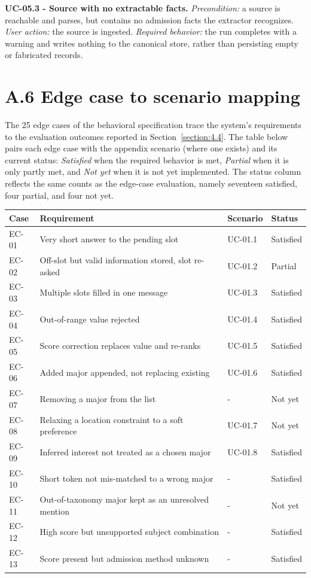 \documentclass[../main.tex]{subfiles}
\begin{document}
\textbf{UC-05.3 - Source with no extractable facts.}
\textit{Precondition:} a source is reachable and parses, but contains no admission facts the extractor recognizes.
\textit{User action:} the source is ingested.
\textit{Required behavior:} the run completes with a warning and writes nothing to the canonical store, rather than persisting empty or fabricated records.

\section*{A.6 Edge case to scenario mapping}

The 25 edge cases of the behavioral specification trace the system's requirements to the evaluation outcomes reported in Section~\ref{section:4.4}. The table below pairs each edge case with the appendix scenario (where one exists) and its current status: \textit{Satisfied} when the required behavior is met, \textit{Partial} when it is only partly met, and \textit{Not yet} when it is not yet implemented. The status column reflects the same counts as the edge-case evaluation, namely seventeen satisfied, four partial, and four not yet.

\noindent\begin{tabular}{@{}p{1.3cm}p{6.0cm}p{2.2cm}p{2.0cm}@{}}
\hline
\textbf{Case} & \textbf{Requirement} & \textbf{Scenario} & \textbf{Status} \\
\hline
EC-01 & Very short answer to the pending slot & UC-01.1 & Satisfied \\
EC-02 & Off-slot but valid information stored, slot re-asked & UC-01.2 & Partial \\
EC-03 & Multiple slots filled in one message & UC-01.3 & Satisfied \\
EC-04 & Out-of-range value rejected & UC-01.4 & Satisfied \\
EC-05 & Score correction replaces value and re-ranks & UC-01.5 & Satisfied \\
EC-06 & Added major appended, not replacing existing & UC-01.6 & Satisfied \\
EC-07 & Removing a major from the list & - & Not yet \\
EC-08 & Relaxing a location constraint to a soft preference & UC-01.7 & Not yet \\
EC-09 & Inferred interest not treated as a chosen major & UC-01.8 & Satisfied \\
EC-10 & Short token not mis-matched to a wrong major & - & Satisfied \\
EC-11 & Out-of-taxonomy major kept as an unresolved mention & - & Not yet \\
EC-12 & High score but unsupported subject combination & - & Satisfied \\
EC-13 & Score present but admission method unknown & - & Satisfied \\
\hline
\end{tabular}
\end{document}
